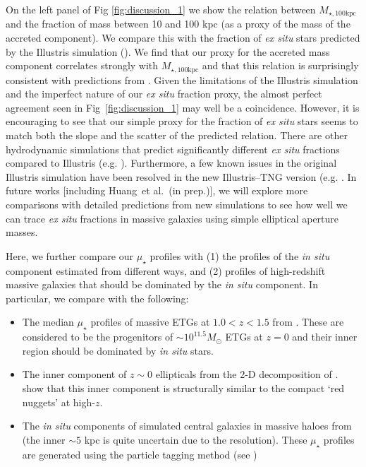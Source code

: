 \documentclass[fleqn,usenatbib]{mnras}
\def\etal{{\ et al.~}}
\def\mtot{{$M_{\star,100\mathrm{kpc}}$}}
\def\mden{{$\mu_{\star}$}}
\begin{document}
    On the left panel of Fig \ref{fig:discussion_1} we show 
    the relation between \mtot{} and the fraction of mass between 10 and 100 kpc 
    (as a proxy of the mass of the accreted component).
    We compare this with the fraction of \textit{ex situ} stars predicted by the 
    Illustris simulation (\citealt{RodriguezGomez2016}).  
    We find that our proxy for the accreted mass component correlates strongly with  
    \mtot{} and that this relation is surprisingly consistent with predictions from
    \citet{RodriguezGomez2016}.  
    Given the limitations of the Illustris simulation and the imperfect nature of 
    our \textit{ex situ} fraction proxy, the almost perfect agreement seen in 
    Fig~\ref{fig:discussion_1} may well be a coincidence.  
    However, it is encouraging to see that our simple proxy for the fraction of 
    \textit{ex situ} stars seems to match both the slope and the scatter of the 
    predicted relation.  
    There are other hydrodynamic simulations that predict significantly different 
    \textit{ex situ} fractions compared to Illustris (e.g. \citealt{Lackner2012, 
    Qu2017}). 
    Furthermore, a few known issues in the original Illustris simulation have been 
    resolved in the new Illustris--TNG version (e.g. \citealt{Genel2017, 
    Pillepich2017}.
    In future works [including Huang\etal (in prep.)], we will explore more 
    comparisons with detailed predictions from new simulations to see how well we 
    can trace \textit{ex situ} fractions in massive galaxies using simple 
    elliptical aperture masses.
    
    Here, we further compare our \mden{} profiles with 
    (1) the profiles of the \textit{in situ} component estimated from different ways,
    and (2) profiles of high-redshift massive galaxies that should be dominated by 
    the \textit{in situ} component.  
    In particular, we compare with the following:   
  
    \begin{itemize}
        
        \item The median \mden{} profiles of massive ETGs at $1.0 < z < 1.5$ from
            \citealt{Patel2013}.
            These are considered to be the progenitors of 
            ${\sim} 10^{11.5} M_{\odot}$ ETGs at $z=0$ and their inner region 
            should be dominated by \textit{in situ} stars. 
    
        \item The inner component of $z{\sim} 0$ ellipticals from the 2-D 
            decomposition of \citet{Huang2013a}. 
            \citet{Huang2013b} show that this inner component is structurally 
            similar to the compact `red nuggets' at high-$z$. 
            
        \item The \textit{in situ} components of simulated central galaxies in 
            massive haloes from \citet{Cooper2013} (the inner ${\sim} 5$ kpc is 
            quite uncertain due to the resolution).  
            These \mden{} profiles are generated using the particle tagging 
            method (see \citealt{Cooper2010})
    
    \end{itemize}
    
\end{document}

